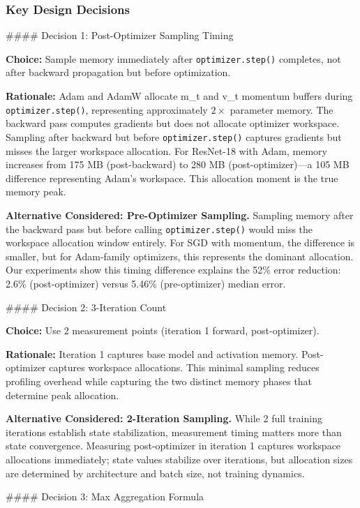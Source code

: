 \subsubsection{Key Design Decisions}

\#\#\#\# Decision 1: Post-Optimizer Sampling Timing

\textbf{Choice:} Sample memory immediately after \texttt{optimizer.step()} completes, not after backward propagation but before optimization.

\textbf{Rationale:} Adam and AdamW allocate m\_t and v\_t momentum buffers during \texttt{optimizer.step()}, representing approximately $2\times$ parameter memory. The backward pass computes gradients but does not allocate optimizer workspace. Sampling after backward but before \texttt{optimizer.step()} captures gradients but misses the larger workspace allocation. For ResNet-18 with Adam, memory increases from 175 MB (post-backward) to 280 MB (post-optimizer)---a 105 MB difference representing Adam's workspace. This allocation moment is the true memory peak.

\textbf{Alternative Considered: Pre-Optimizer Sampling.} Sampling memory after the backward pass but before calling \texttt{optimizer.step()} would miss the workspace allocation window entirely. For SGD with momentum, the difference is smaller, but for Adam-family optimizers, this represents the dominant allocation. Our experiments show this timing difference explains the 52\% error reduction: 2.6\% (post-optimizer) versus 5.46\% (pre-optimizer) median error.

\#\#\#\# Decision 2: 3-Iteration Count

\textbf{Choice:} Use 2 measurement points (iteration 1 forward, post-optimizer).

\textbf{Rationale:} Iteration 1 captures base model and activation memory. Post-optimizer captures workspace allocations. This minimal sampling reduces profiling overhead while capturing the two distinct memory phases that determine peak allocation.

\textbf{Alternative Considered: 2-Iteration Sampling.} While 2 full training iterations establish state stabilization, measurement timing matters more than state convergence. Measuring post-optimizer in iteration 1 captures workspace allocations immediately; state values stabilize over iterations, but allocation sizes are determined by architecture and batch size, not training dynamics.

\#\#\#\# Decision 3: Max Aggregation Formula

